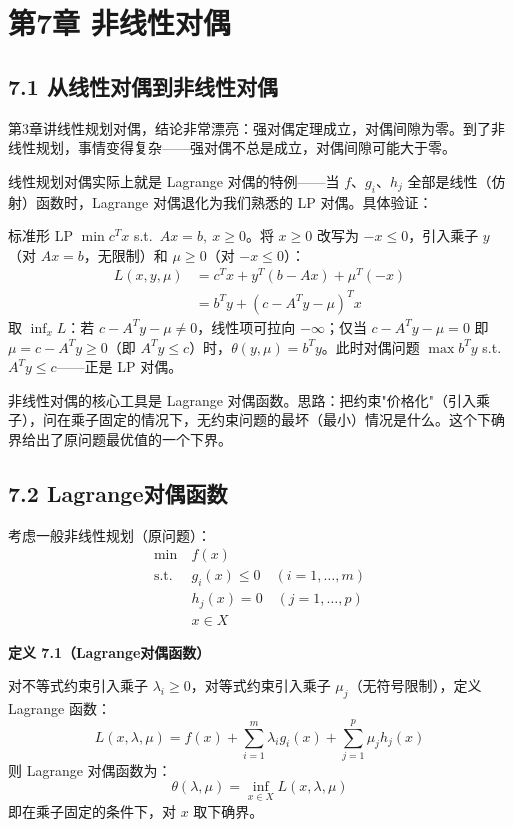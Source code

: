 \section{第7章 \quad 非线性对偶}

\subsection{7.1 从线性对偶到非线性对偶}

第3章讲线性规划对偶，结论非常漂亮：强对偶定理成立，对偶间隙为零。到了非线性规划，事情变得复杂——强对偶不总是成立，对偶间隙可能大于零。

线性规划对偶实际上就是 Lagrange 对偶的特例——当 $f$、$g_i$、$h_j$ 全部是线性（仿射）函数时，Lagrange 对偶退化为我们熟悉的 LP 对偶。具体验证：

标准形 LP $\min c^T x$ s.t.\ $Ax=b,\ x\ge0$。将 $x\ge0$ 改写为 $-x\le0$，引入乘子 $y$（对 $Ax=b$，无限制）和 $\mu\ge0$（对 $-x\le0$）：
\begin{align*}
L(x,y,\mu) &= c^T x + y^T(b-Ax) + \mu^T(-x) \\
           &= b^T y + (c - A^T y - \mu)^T x
\end{align*}
取 $\inf_x L$：若 $c-A^T y-\mu\neq0$，线性项可拉向 $-\infty$；仅当 $c-A^T y-\mu=0$ 即 $\mu=c-A^T y\ge0$（即 $A^T y\le c$）时，$\theta(y,\mu)=b^T y$。此时对偶问题 $\max b^T y$ s.t.\ $A^T y\le c$——正是 LP 对偶。

非线性对偶的核心工具是 Lagrange 对偶函数。思路：把约束"价格化"（引入乘子），问在乘子固定的情况下，无约束问题的最坏（最小）情况是什么。这个下确界给出了原问题最优值的一个下界。

\subsection{7.2 Lagrange对偶函数}

考虑一般非线性规划（原问题）：
\[
\begin{aligned}
\min\ & f(x) \\
\text{s.t.}\ & g_i(x) \le 0 \quad (i=1,\dots,m) \\
& h_j(x) = 0 \quad (j=1,\dots,p) \\
& x \in X
\end{aligned}
\]

\textbf{定义 7.1（Lagrange对偶函数）}

对不等式约束引入乘子 $\lambda_i \ge 0$，对等式约束引入乘子 $\mu_j$（无符号限制），定义 Lagrange 函数：
\[
L(x,\lambda,\mu) = f(x) + \sum_{i=1}^m \lambda_i g_i(x) + \sum_{j=1}^p \mu_j h_j(x)
\]
则 Lagrange 对偶函数为：
\[
\theta(\lambda,\mu) = \inf_{x \in X} L(x,\lambda,\mu)
\]
即在乘子固定的条件下，对 $x$ 取下确界。

